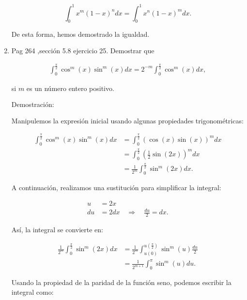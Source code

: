 \documentclass{report}
\begin{document}
\begin{enumerate}
        \[\int_{0}^{1} x^{m}(1-x)^{n} dx = \int_{0}^{1} x^{n}(1 - x)^{m} dx.\]
        
        De esta forma, hemos demostrado la igualdad.
        
        \item Pag 264 ,sección 5.8 ejercicio 25. Demostrar que
        
        \begin{align*}
        \int_{0}^{\frac{\pi}{2}} \cos^m(x) \sin^m(x) dx = 2^{-m} \int_{0}^{\frac{\pi}{2}} \cos^m(x) dx,
        \end{align*}
        
        si $m$ es un número entero positivo.
        
        Demostración:
        
        Manipulemos la expresión inicial usando algunas propiedades trigonométricas:
        
        \begin{align*}
        \int_{0}^{\frac{\pi}{2}} \cos^m(x) \sin^m(x) dx &= \int_{0}^{\frac{\pi}{2}} (\cos(x)\sin(x))^m dx\\
        &= \int_{0}^{\frac{\pi}{2}} \left(\frac{1}{2}\sin(2x)\right)^m dx\\
        &= \frac{1}{2^m}\int_{0}^{\frac{\pi}{2}} \sin^m(2x) dx.
        \end{align*}
        
        A continuación, realizamos una sustitución para simplificar la integral:
        
        \begin{align*}
        u &= 2x\\
        du &= 2dx  \quad \Rightarrow \quad \frac{du}{2} = dx.
        \end{align*}
        
        Así, la integral se convierte en:
        
        \begin{align*}
        \frac{1}{2^m}\int_{0}^{\frac{\pi}{2}} \sin^m(2x) dx &= \frac{1}{2^m}\int_{u(0)}^{u\left(\frac{\pi}{2}\right)} \sin^m(u)\frac{du}{2}\\
        &= \frac{1}{2^{m+1}}\int_{0}^{\pi} \sin^m(u) du.
        \end{align*}
        
        Usando la propiedad de la paridad de la función seno, podemos escribir la integral como:
        

\end{enumerate}
\end{document}

